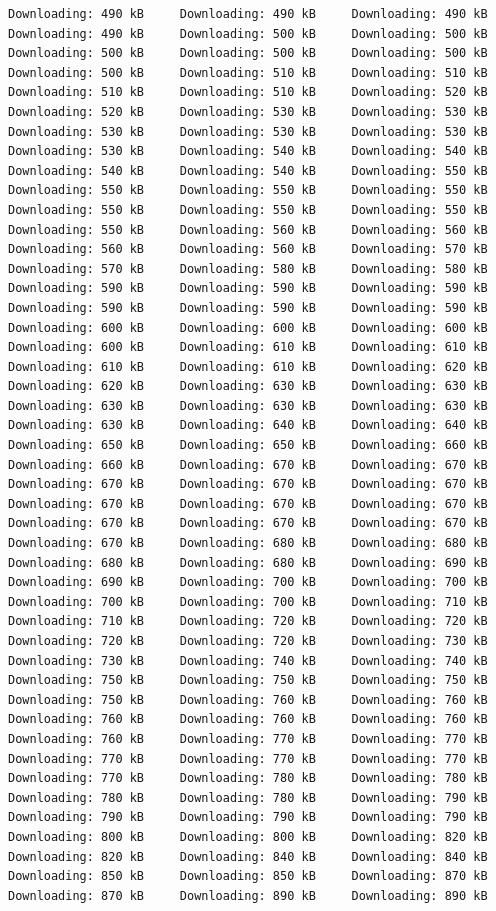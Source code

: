 \documentclass[
]{book}
\begin{document}
\begin{verbatim}
Downloading: 490 kB     Downloading: 490 kB     Downloading: 490 kB     Downloading: 490 kB     Downloading: 500 kB     Downloading: 500 kB     Downloading: 500 kB     Downloading: 500 kB     Downloading: 500 kB     Downloading: 500 kB     Downloading: 510 kB     Downloading: 510 kB     Downloading: 510 kB     Downloading: 510 kB     Downloading: 520 kB     Downloading: 520 kB     Downloading: 530 kB     Downloading: 530 kB     Downloading: 530 kB     Downloading: 530 kB     Downloading: 530 kB     Downloading: 530 kB     Downloading: 540 kB     Downloading: 540 kB     Downloading: 540 kB     Downloading: 540 kB     Downloading: 550 kB     Downloading: 550 kB     Downloading: 550 kB     Downloading: 550 kB     Downloading: 550 kB     Downloading: 550 kB     Downloading: 550 kB     Downloading: 550 kB     Downloading: 560 kB     Downloading: 560 kB     Downloading: 560 kB     Downloading: 560 kB     Downloading: 570 kB     Downloading: 570 kB     Downloading: 580 kB     Downloading: 580 kB     Downloading: 590 kB     Downloading: 590 kB     Downloading: 590 kB     Downloading: 590 kB     Downloading: 590 kB     Downloading: 590 kB     Downloading: 600 kB     Downloading: 600 kB     Downloading: 600 kB     Downloading: 600 kB     Downloading: 610 kB     Downloading: 610 kB     Downloading: 610 kB     Downloading: 610 kB     Downloading: 620 kB     Downloading: 620 kB     Downloading: 630 kB     Downloading: 630 kB     Downloading: 630 kB     Downloading: 630 kB     Downloading: 630 kB     Downloading: 630 kB     Downloading: 640 kB     Downloading: 640 kB     Downloading: 650 kB     Downloading: 650 kB     Downloading: 660 kB     Downloading: 660 kB     Downloading: 670 kB     Downloading: 670 kB     Downloading: 670 kB     Downloading: 670 kB     Downloading: 670 kB     Downloading: 670 kB     Downloading: 670 kB     Downloading: 670 kB     Downloading: 670 kB     Downloading: 670 kB     Downloading: 670 kB     Downloading: 670 kB     Downloading: 680 kB     Downloading: 680 kB     Downloading: 680 kB     Downloading: 680 kB     Downloading: 690 kB     Downloading: 690 kB     Downloading: 700 kB     Downloading: 700 kB     Downloading: 700 kB     Downloading: 700 kB     Downloading: 710 kB     Downloading: 710 kB     Downloading: 720 kB     Downloading: 720 kB     Downloading: 720 kB     Downloading: 720 kB     Downloading: 730 kB     Downloading: 730 kB     Downloading: 740 kB     Downloading: 740 kB     Downloading: 750 kB     Downloading: 750 kB     Downloading: 750 kB     Downloading: 750 kB     Downloading: 760 kB     Downloading: 760 kB     Downloading: 760 kB     Downloading: 760 kB     Downloading: 760 kB     Downloading: 760 kB     Downloading: 770 kB     Downloading: 770 kB     Downloading: 770 kB     Downloading: 770 kB     Downloading: 770 kB     Downloading: 770 kB     Downloading: 780 kB     Downloading: 780 kB     Downloading: 780 kB     Downloading: 780 kB     Downloading: 790 kB     Downloading: 790 kB     Downloading: 790 kB     Downloading: 790 kB     Downloading: 800 kB     Downloading: 800 kB     Downloading: 820 kB     Downloading: 820 kB     Downloading: 840 kB     Downloading: 840 kB     Downloading: 850 kB     Downloading: 850 kB     Downloading: 870 kB     Downloading: 870 kB     Downloading: 890 kB     Downloading: 890 kB     
\end{verbatim}
\end{document}
